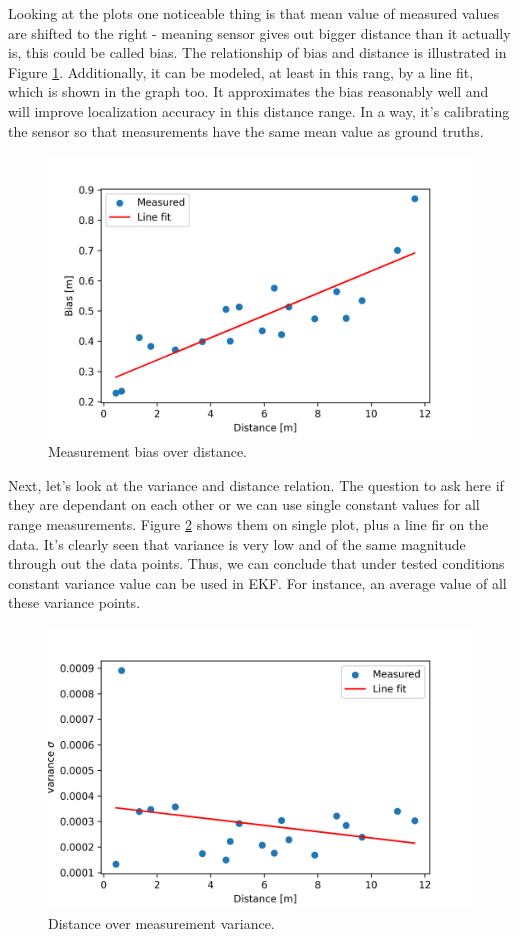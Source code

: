 Looking at the plots one noticeable thing is that mean value of measured values are shifted to the right - meaning sensor gives out bigger distance than it actually is, this could be called bias. The relationship of bias and distance is illustrated in Figure \ref{fig:distance_bias}. Additionally, it can be modeled, at least in this rang,  by a line fit, which is shown in the graph too. It approximates the bias reasonably well and will improve localization accuracy in this distance range. In a way, it's calibrating the sensor so that measurements have the same mean value as ground truths.
\begin{figure}[H]
    \includegraphics[width=\linewidth]{figures/distance_bias.png}
    \caption{Measurement bias over distance.}
    \label{fig:distance_bias}
\end{figure}

Next, let's look at the variance and distance relation. The question to ask here if they are dependant on each other or we can use single constant values for all range measurements. Figure \ref{fig:distance_var} shows them on single plot, plus a line fir on the data. It's clearly seen that variance is very low and of the same magnitude through out the data points. Thus, we can conclude that under tested conditions constant variance value can be used in EKF. For instance, an average value of all these variance points.
\begin{figure}[H]
    \centering
    \includegraphics[width=\linewidth]{figures/dist_variance.png}
    \caption{Distance over measurement variance.}
    \label{fig:distance_var}
\end{figure}